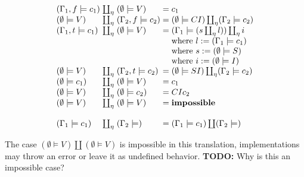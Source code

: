 \documentclass[conference]{IEEEtran}
\begin{document}
\begin{equation*}
    \arraycolsep=1.4pt
    \begin{array}{l l l l l}
        (\Gamma_1,f \models c_1) & \coprod_\eta & (\emptyset \models V)    & = & c_1                                                        \\
        (\emptyset \models V)    & \coprod_\eta & (\Gamma_2,f \models c_2) & = & (\emptyset \models CI) \coprod_\eta (\Gamma_2 \models c_2) \\

        (\Gamma_1,t \models c_1) & \coprod_\eta & (\emptyset \models V)    & = & (\Gamma_1 \models (s \coprod_\eta l)) \coprod_\eta i       \\
                                 &              &                          &   & \text{where } l := (\Gamma_1 \models c_1 )                 \\
                                 &              &                          &   & \text{where } s := (\emptyset \models S )                  \\
                                 &              &                          &   & \text{where } i := (\emptyset \models I )                  \\
        (\emptyset \models V)    & \coprod_\eta & (\Gamma_2,t \models c_2) & = & (\emptyset \models SI) \coprod_\eta (\Gamma_2 \models c_2) \\
        (\emptyset \models c_1)  & \coprod_\eta & (\emptyset \models V)    & = & c_1                                                        \\
        (\emptyset \models V)    & \coprod_\eta & (\emptyset \models c_2)  & = & CI c_2                                                     \\
        (\emptyset \models V)    & \coprod_\eta & (\emptyset \models V)    & = & \mathbf{impossible}                                        \\
        \\

        (\Gamma_1 \models c_1)   & \coprod_\eta & (\Gamma_2 \models)       & = & (\Gamma_1 \models c_1) \coprod (\Gamma_2 \models)          \\
    \end{array}
\end{equation*}

The case $(\emptyset \models V) \coprod (\emptyset \models V) $ is impossible in this translation, implementations may throw an error or leave it as undefined behavior.
\textbf{TODO:} Why is this an impossible case?
\end{document}
